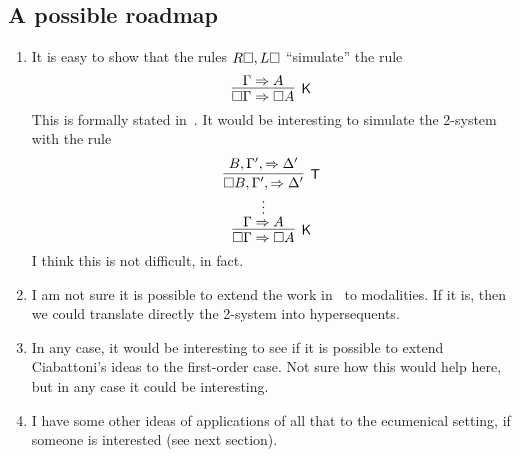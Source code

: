 \subsection{A possible roadmap}
\begin{enumerate}
\item It is easy to show that the rules $R\square,L\square$ ``simulate'' the rule 
\[
\infer[\K]{\Box\Gamma\seq\Box A}{\Gamma\seq A}
\]
This is formally stated in~\cite{DBLP:conf/tableaux/PimentelRL19}. It would be interesting to simulate the 2-system
with the rule
\[
\infer[\K]{\Box\Gamma\seq\Box A}
{\deduce{\Gamma\seq A}
{\deduce{\vdots}
{\infer[\T]{\Box B,\Gamma',\seq\Delta'}{B,\Gamma',\seq\Delta'}}}}
\]
I think this is not difficult, in fact.
\item I am not sure it is possible to extend the work in~\cite{DBLP:journals/tocl/CiabattoniG18} to modalities. If it is, then we could translate directly the 2-system into hypersequents.
\item  In any case, it would be interesting to see if it is possible to extend Ciabattoni's ideas to the first-order case. Not sure how this would help here, but in any case it could be interesting.
\item  I have some other ideas of applications of all that to the ecumenical setting, if someone is interested (see next section).
\end{enumerate}
